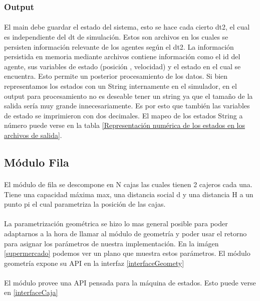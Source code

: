 \documentclass{article}
\begin{document}
\subsubsection{Output}

\paragraph{}
El main debe guardar el estado del sistema, esto se hace cada cierto dt2, el cual es independiente del dt de simulación. Estos son archivos en los cuales se persisten información relevante de los agentes según el dt2. La información persistida en memoria mediante archivos contiene información como el id del agente, sus variables de estado (posición , velocidad) y el estado en el cual se encuentra. Esto permite un posterior procesamiento de los datos. Si bien representamos los estados con un String internamente en el simulador, en el output para procesamiento no es deseable tener un string ya que el tamaño de la salida sería muy grande innecesariamente. Es por esto que también las variables de estado se imprimieron con dos decimales. El mapeo de los estados String a número puede verse en la tabla \ref {Representación numérica de los estados en los archivos de salida}.


\subsection{Módulo Fila}

\paragraph{}
El módulo de fila se descompone en N cajas las cuales tienen 2 cajeros cada una. Tiene una capacidad máxima max, una distancia social d y una distancia H a un punto pi el cual parametriza la posición de las cajas.

\paragraph{}
La parametrización geométrica se hizo lo mas general posible para poder adaptarnos a la hora de llamar al módulo de geometría y poder usar el retorno para asignar los parámetros de nuestra implementación. En la imágen \ref{supermercado} podemos ver un plano que muestra estos parámetros. El módulo geometría expone su API en la interfaz \ref{interfaceGeomety}

\paragraph{}
El módulo provee una API pensada para la máquina de estados. Esto puede verse en \ref{interfaceCaja}
\end{document}
